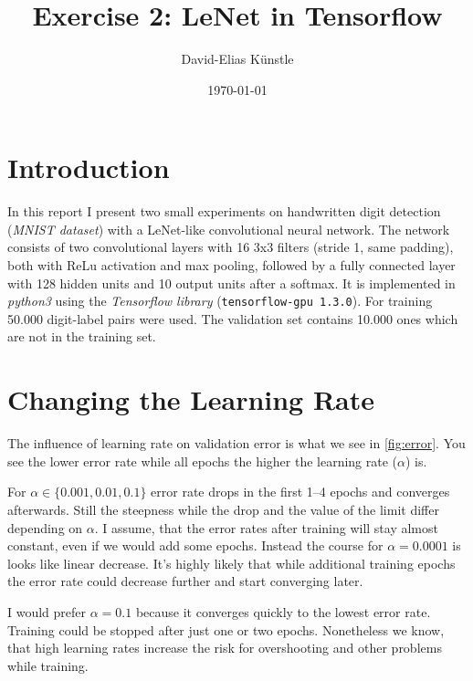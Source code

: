 \documentclass[a4paper,14pt]{article}
\begin{document}
\title{Exercise 2: LeNet in Tensorflow}
\author{David-Elias K\"unstle}
\date{\today}
\maketitle
\section{Introduction}

In this report I present two small experiments on handwritten digit detection
(\emph{MNIST dataset}) with a LeNet-like convolutional neural network.
The network consists of two convolutional layers with 16 3x3 filters (stride 1, same
padding), both with ReLu activation and max pooling,
followed by a fully connected layer with 128 hidden units and 10 output units
after a softmax.
It is implemented in \emph{python3} using the \emph{Tensorflow library}
(\texttt{tensorflow-gpu 1.3.0}).
For training 50.000 digit-label pairs were used. The validation set contains
10.000 ones which are not in the training set.


\section{Changing the Learning Rate}

The influence of learning rate on validation error is what we see in
\autoref{fig:error}.
You see the lower error rate while all epochs the higher the learning
rate ($\alpha$) is.

For $\alpha \in \{0.001, 0.01, 0.1\}$ error rate drops in the first 1--4 epochs
and converges afterwards.
Still the steepness while the drop and the value of the limit differ depending
on $\alpha$.
I assume, that the error rates after training will stay almost constant, even if we
would add some epochs.
Instead the course for $\alpha = 0.0001$ is looks like linear
decrease.
It's highly likely that while additional training epochs the error rate could decrease further
and start converging later.

I would prefer $\alpha=0.1$ because it converges quickly to the lowest error rate.
Training could be stopped after just one or two epochs.
Nonetheless we know, that high learning rates increase the risk for overshooting
and other problems while training.
\end{document}
